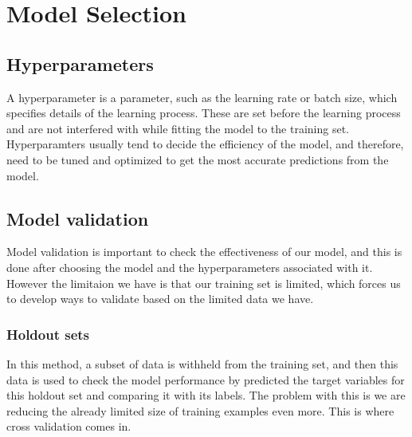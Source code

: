 \documentclass[12pt]{article}
\begin{document}
\section{Model Selection}
\subsection{Hyperparameters}
A hyperparameter is a parameter, such as the learning rate or batch size, which specifies details of the learning process. These are set before the learning process and are not interfered with while fitting the model to the training set. Hyperparamters usually tend to decide the efficiency of the model, and therefore, need to be tuned and optimized to get the most accurate predictions from the model.

\subsection{Model validation}
Model validation is important to check the effectiveness of our model, and this is done after choosing the model and the hyperparameters associated with it. However the limitaion we have is that our training set is limited, which forces us to develop ways to validate based on the limited data we have.
\subsubsection*{Holdout sets}
In this method, a subset of data is withheld from the training set, and then this data is used to check the model performance by predicted the target variables for this holdout set and comparing it with its labels. The problem with this is we are reducing the already limited size of training examples even more. This is where cross validation comes in.
\end{document}
